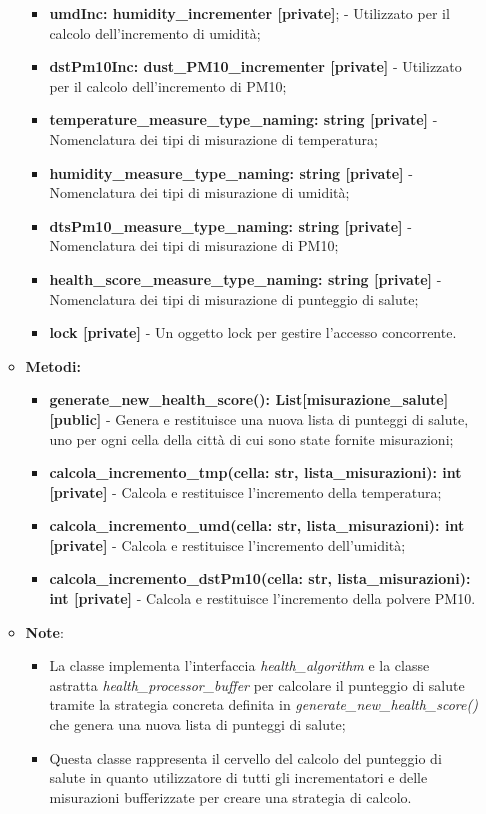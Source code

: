 \begin{itemize}
\begin{itemize}
\begin{itemize}
        \item \textbf{umdInc: humidity\_incrementer [private]}; - Utilizzato per il calcolo dell'incremento di umidità;
        \item \textbf{dstPm10Inc: dust\_PM10\_incrementer [private]} - Utilizzato per il calcolo dell'incremento di PM10;
        \item \textbf{temperature\_measure\_type\_naming: string [private]} - Nomenclatura dei tipi di misurazione di temperatura;
        \item \textbf{humidity\_measure\_type\_naming: string [private]} - Nomenclatura dei tipi di misurazione di umidità;
        \item \textbf{ dtsPm10\_measure\_type\_naming: string [private]} - Nomenclatura dei tipi di misurazione di PM10;
        \item \textbf{ health\_score\_measure\_type\_naming: string [private]} - Nomenclatura dei tipi di misurazione di punteggio di salute;
        \item \textbf{lock [private]} - Un oggetto lock per gestire l'accesso concorrente.
    \end{itemize}
    \item \textbf{Metodi:}
    \begin{itemize}
        \item \textbf{generate\_new\_health\_score(): List[misurazione\_salute] [public]} - Genera e restituisce una nuova lista di punteggi di salute, uno per ogni cella della città di cui sono state fornite misurazioni;
        \item \textbf{calcola\_incremento\_tmp(cella: str, lista\_misurazioni): int [private]} - Calcola e restituisce l'incremento della temperatura;
        \item \textbf{calcola\_incremento\_umd(cella: str, lista\_misurazioni): int [private]} - Calcola e restituisce l'incremento dell'umidità;
        \item \textbf{calcola\_incremento\_dstPm10(cella: str, lista\_misurazioni): int [private]} - Calcola e restituisce l'incremento della polvere PM10.
    \end{itemize}
    \item\textbf{Note}:
        \begin{itemize}
            \item La classe implementa l'interfaccia \textit{health\_algorithm} e la classe astratta \textit{health\_processor\_buffer} per calcolare il punteggio di salute tramite la strategia concreta definita in \textit{generate\_new\_health\_score()} che genera una nuova lista di punteggi di salute;
            \item Questa classe rappresenta il cervello del calcolo del punteggio di salute in quanto utilizzatore di tutti gli incrementatori e delle misurazioni bufferizzate per creare una strategia di calcolo.
        \end{itemize}
    \end{itemize}


\end{itemize}
